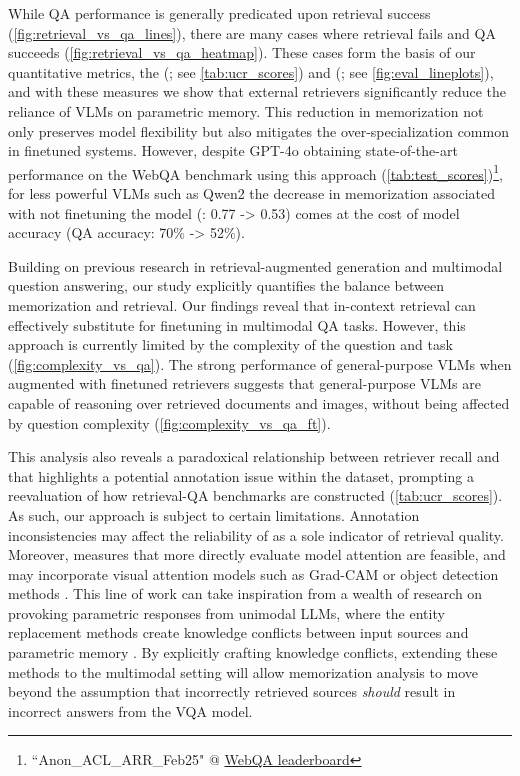 While QA performance is generally predicated upon retrieval success (\autoref{fig:retrieval_vs_qa_lines}), there are many cases where retrieval fails and QA succeeds (\autoref{fig:retrieval_vs_qa_heatmap}). These cases form the basis of our quantitative metrics, the \ucr (\UCR; see \autoref{tab:ucr_scores}) and \ppr (\PPR; see \autoref{fig:eval_lineplots}), and with these measures we show that external retrievers significantly reduce the reliance of VLMs on parametric memory. This reduction in memorization not only preserves model flexibility but also mitigates the over-specialization common in finetuned systems. However, despite GPT-4o obtaining state-of-the-art performance on the WebQA benchmark using this approach (\autoref{tab:test_scores})\footnote{``Anon\_ACL\_ARR\_Feb25" @ \href{https://eval.ai/web/challenges/challenge-page/1255/leaderboard/3168}{WebQA leaderboard}}, for less powerful VLMs such as Qwen2 the decrease in memorization  associated with not finetuning the model (\PPR: 0.77 -> 0.53) comes at the cost of model accuracy (QA accuracy: 70\% -> 52\%).


Building on previous research in retrieval-augmented generation and multimodal question answering, our study explicitly quantifies the balance between memorization and retrieval. Our findings reveal that in-context retrieval can effectively substitute for finetuning in multimodal QA tasks. However, this approach is currently limited by the complexity of the question and task (\autoref{fig:complexity_vs_qa}). The strong performance of general-purpose VLMs when augmented with finetuned retrievers suggests that general-purpose VLMs are capable of reasoning over retrieved documents and images, without being affected by question complexity (\autoref{fig:complexity_vs_qa_ft}). 

This analysis also reveals a paradoxical relationship between retriever recall and \UCR that highlights a potential annotation issue within the dataset, prompting a reevaluation of how retrieval-QA benchmarks are constructed (\autoref{tab:ucr_scores}). As such, our approach is subject to certain limitations. Annotation inconsistencies may affect the reliability of \UCR as a sole indicator of retrieval quality. Moreover, measures that more directly evaluate model attention are feasible, and may incorporate visual attention models such as Grad-CAM \citep{selvaraju_grad-cam_2020} or object detection methods \citep{ravi_sam_2024}. This line of work can take inspiration from a wealth of research on provoking parametric responses from unimodal LLMs, where the entity replacement methods \citep{longpre_entity-based_2022,neeman_disentqa_2022} create knowledge conflicts between input sources and parametric memory \citep{xu_knowledge_2024,hong_why_2024,chen_rich_2022}. By explicitly crafting knowledge conflicts, extending these methods to the multimodal setting will allow memorization analysis to move beyond the assumption that incorrectly retrieved sources \textit{should} result in incorrect answers from the VQA model.

